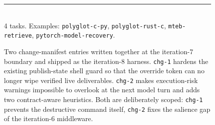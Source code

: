\begin{figure}[t]
\begin{tcbraster}
\begin{tcolorbox}[colback=aheTeal!12,colframe=aheBlue,colbacktitle=aheBlue,
                          title={\scriptsize\textbf{chg-2, iteration 8, commit \texttt{a4a4a29}, level: middleware}}]
            \rule{\linewidth}{0.3pt}\\[1pt]
            4 tasks. Examples: \texttt{polyglot-c-py}, \texttt{polyglot-rust-c}, \texttt{mteb-retrieve}, \texttt{pytorch-model-recovery}.
        \end{tcolorbox}
    \end{tcbraster}
    \caption{Two change-manifest entries written together at the iteration-7 boundary and shipped as the iteration-8 harness. \texttt{chg-1} hardens the existing publish-state shell guard so that the override token can no longer wipe verified live deliverables. \texttt{chg-2} makes execution-risk warnings impossible to overlook at the next model turn and adds two contract-aware heuristics. Both are deliberately scoped: \texttt{chg-1} prevents the destructive command itself, \texttt{chg-2} fixes the salience gap of the iteration-6 middleware.}
    \label{fig:manifest-hardblock}
\end{figure}
